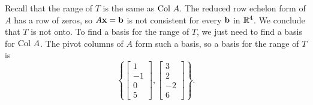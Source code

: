 \begin{example}
\item Recall that the range of $T$ is the same as $\text{Col } A$. The reduced row echelon form of $A$ has a row of zeros, so $A \mathbf{x} = \mathbf{b}$ is not consistent for every $\mathbf{b}$ in $\mathbb{R}^4$. We conclude that $T$ is not onto. To find a basis for the range of $T$, we just need to find a basis for $\text{Col } A$. The pivot columns of $A$ form such a basis, so a basis for the range of $T$ is 
\[\left\{ \left[ \begin{array}{r} 1\\-1 \\ 0\\5 \end{array} \right], \left[ \begin{array}{r} 3\\2 \\ -2\\6 \end{array} \right] \right\}.\]

\ea

\end{example}


